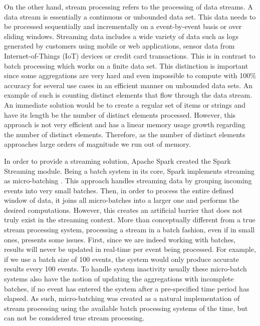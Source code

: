 On the other hand, stream processing refers to the processing of data streams. A data stream is essentially a continuous or unbounded data set. This data needs to be processed sequentially and incrementally on a event-by-event basis or over sliding windows. Streaming data includes a wide variety of data such as logs generated by customers using mobile or web applications, sensor data from Internet-of-Things (IoT) devices or credit card transactions. This is in contrast to batch processing which works on a finite data set. This distinction is important since some aggregations are very hard and even impossible to compute with 100\% accuracy for several use cases in an efficient manner on unbounded data sets. An example of such is counting distinct elements that flow through the data stream. An immediate solution would be to create a regular set of items or strings and have its length be the number of distinct elements processed. However, this approach is not very efficient and has a linear memory usage growth regarding the number of distinct elements. Therefore, as the number of distinct elements approaches large orders of magnitude we run out of memory.

In order to provide a streaming solution, Apache Spark created the Spark Streaming \cite{SparkStreaming} module. Being a batch system in its core, Spark implements streaming as micro-batching \cite{SparkStreamingPaper}. This approach handles streaming data by grouping incoming events into very small batches. Then, in order to process the entire defined window of data, it joins all micro-batches into a larger one and performs the desired computations. However, this creates an artificial barrier that does not truly exist in the streaming context. More than conceptually different from a true stream processing system, processing a stream in a batch fashion, even if in small ones, presents some issues. First, since we are indeed working with batches, results will never be updated in real-time per event being processed. For example, if we use a batch size of 100 events, the system would only produce accurate results every 100 events. To handle system inactivity usually these micro-batch systems also have the notion of updating the aggregations with incomplete batches, if no event has entered the system after a pre-specified time period has elapsed. As such, micro-batching was created as a natural implementation of stream processing using the available batch processing systems of the time, but can not be considered true stream processing.


